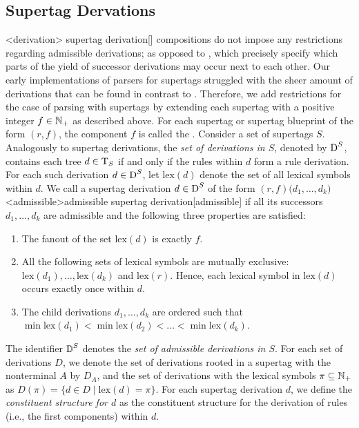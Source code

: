 \documentclass[../../document.tex]{subfiles}
\begin{document}
    \subsection*{ Supertag Dervations}
    <derivation>{ supertag derivation}[]
     compositions do not impose any restrictions regarding admissible derivations; as opposed to , which precisely specify which parts of the yield of successor derivations may occur next to each other.
    Our early implementations of parsers for  supertags struggled with the sheer amount of derivations that can be found in contrast to .
    Therefore, we add restrictions for the case of parsing with  supertags by extending each supertag with a positive integer \(f\in \mathbb{N}_+\) as described above.
    For each  supertag or  supertag blueprint of the form \((r,f)\), the component \(f\) is called the .
    Consider a set of  supertags \(S\).
    Analogously to  supertag derivations, the \emph{set of derivations in \(S\)}, denoted by \(\operatorname{D}^S\), contains each tree \(d \in \operatorname{T}_S\) if and only if the  rules within  \(d\) form a  rule derivation.
    For each such derivation \(d \in \operatorname{D}^S\), let \(\mathrm{lex}(d)\) denote the set of all lexical symbols within \(d\).
    We call a  supertag derivation \(d \in \operatorname{D}^S\) of the form \((r, f)\big(d_1, \ldots, d_k\big)\) <admissible>{admissible  supertag derivation}[admissible] if all its successors \(d_1, \ldots, d_k\) are admissible and the following three properties are satisfied:
    \begin{enumerate}
        \item The fanout of the set \(\mathrm{lex}(d)\) is exactly \(f\).
        \item All the following sets of lexical symbols are mutually exclusive: \(\mathrm{lex}(d_1), \ldots, \mathrm{lex}(d_k)\) and \(\mathrm{lex}(r)\). Hence, each lexical symbol in \(\mathrm{lex}(d)\) occurs exactly once within \(d\).
        \item\label{prop:dcp:admissible:order}
            The child derivations \(d_1, \ldots, d_k\) are ordered such that \(\min \mathrm{lex}(d_1) < \min \mathrm{lex}(d_2) < \ldots < \min \mathrm{lex}(d_k)\). 
    \end{enumerate}
    The identifier \(\operatorname{\mathbb{D}}^S\) denotes the \emph{set of admissible derivations in \(S\)}.
    For each set of derivations \(D\), we denote the set of derivations rooted in a supertag with the  nonterminal \(A\) by \(D_A\), and the set of derivations with the lexical symbols \(\pi\subseteq\mathbb{N}_+\) as \(D(\pi) = \{d \in D \mid \mathrm{lex}(d) = \pi\}\).
    For each  supertag derivation \(d\), we define the \emph{constituent structure for \(d\)} as the constituent structure for the derivation of  rules (i.e., the first components) within \(d\).
\end{document}

